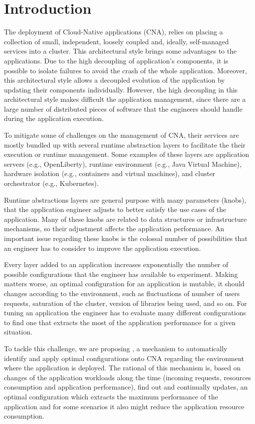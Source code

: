 \section{Introduction}

The deployment of Cloud-Native applications (CNA), relies on placing a collection of small, independent, loosely
coupled and, ideally, self-managed services into a cluster. This architectural style brings some advantages to the
applications. Due to the high decoupling of application's components, it is possible to isolate failures to avoid the
crash of the whole application. Moreover, this architectural style allows a decoupled evolution of the application by
updating their components individually. However, the high decoupling in this architectural style makes difficult the
application management, since there are a large number of distributed pieces of software that the engineers should
handle during the application execution.

To mitigate some of challenges on the management of CNA, their services are mostly bundled up with several runtime
abstraction layers to facilitate the their execution or runtime management. Some examples of these layers are
application servers (e.g., OpenLiberty), runtime environment (e.g., Java Virtual Machine), hardware isolation (e.g.,
containers and virtual machines), and cluster orchestrator (e.g., Kubernetes).

Runtime abstractions layers are general purpose with many parameters (knobs), that the application engineer adjusts to
better satisfy the use cases of the application. Many of these knobs are related to data structures or infrastructure
mechanisms, so their adjustment affects the application performance. An important issue regarding these knobs is the
colossal number of possibilities that an engineer has to consider to improve the application execution.

Every layer added to an application increases exponentially the number of possible configurations that the engineer has
available to experiment. Making matters worse, an optimal configuration for an application is mutable, it should
changes according to the environment, such as fluctuations of number of users requests, saturation of the cluster,
version of libraries being used, and so on. For tuning an application the engineer has to evaluate many different
configurations to find one that extracts the most of the application performance for a given situation.

To tackle this challenge, we are proposing \name, a mechanism to automatically identify and apply optimal
configurations onto CNA regarding the environment where the application is deployed. The rational of this mechanism is,
based on changes of the application workloads along the time (incoming requests, resources consumption and application
performance), find out and continually updates, an optimal configuration which extracts the maximum performance of the
application and for some scenarios it also might reduce the application resource consumption.

